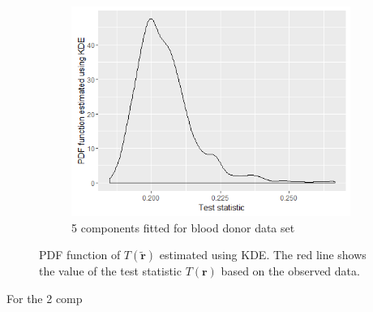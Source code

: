 \begin{figure}[!htb]
\begin{subfigure}[b]{0.4\textwidth}
		\includegraphics[width=\textwidth]{mainmatter/chapter_6_blood_donor/ppc_5comp.png}	
          \caption{\label{fig : ppc_blood_donor_5comp}5 components fitted for blood donor data set}
	\end{subfigure}
	
	\caption{PDF function of $T(\boldsymbol{\tilde{r}})$ estimated using KDE. The red line shows the value of the test statistic $T(\boldsymbol{r})$ based on the observed data.}
	\label{fig : ppc_blood_donor}    
\end{figure} 

For the 2 comp